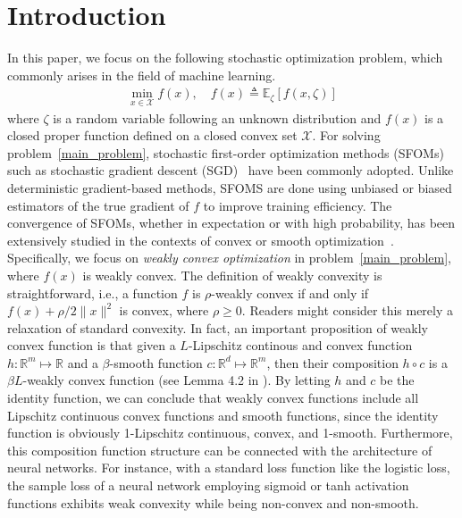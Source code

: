 \documentclass{article}
\def \E {\mathbb{E}}
\def \X {\mathcal{X}}
\def \R {\mathbb{R}}
\begin{document}
\section{Introduction}
In this paper, we focus on the following stochastic optimization problem, which commonly arises in the field of machine learning.
\begin{align}\label{main_problem}
        \min_{x\in\mathcal{X}} f(x),\quad f(x)\triangleq \E_\zeta[f(x,\zeta)]
\end{align}
where $\zeta$ is a random variable following an unknown distribution and $f(x)$ is a closed proper function defined on a closed convex set $\X$. For solving problem~\eqref{main_problem}, stochastic first-order optimization methods (SFOMs) such as stochastic gradient descent (SGD)~\citep{Robbins1951ASA} have been commonly adopted. Unlike deterministic gradient-based methods, SFOMS are done using unbiased or biased estimators of the true gradient of $f$ to improve training efficiency. The convergence of SFOMs, whether in expectation or with high probability, has been extensively studied in the contexts of convex or smooth optimization~\citep{ghadimi2013stochastic,fang2018spider,cutkosky2019momentum,lan2020first, cutkosky2020momentum,liuzijian_2023}. Specifically, we focus on \textit{weakly convex optimization} in problem~\eqref{main_problem}, where $f(x)$ is weakly convex. The definition of weakly convexity is straightforward, i.e., a function $f$ is $\rho$-weakly convex if and only if $f(x)+\rho/2\|x\|^2$ is convex, where $\rho\geq0$. Readers might consider this merely a relaxation of standard convexity. In fact, an important proposition of weakly convex function is that given a $L$-Lipschitz continous and convex function $h:\R^m\mapsto\R$ and a $\beta$-smooth function $c:\R^d\mapsto\R^m$, then their composition $h\circ c$ is a $\beta L$-weakly convex function (see Lemma 4.2 in \citep{drusvyatskiy2017efficiencyminimizingcompositionsconvex}). By letting $h$ and $c$ be the identity function, we can conclude that weakly convex functions include all Lipschitz continuous convex functions and smooth functions, since the identity function is obviously 1-Lipschitz continuous, convex, and 1-smooth. Furthermore, this composition function structure can be connected with the architecture of neural networks. For instance, with a standard loss function like the logistic loss, the sample loss of a neural network employing sigmoid or tanh activation functions exhibits weak convexity while being non-convex and non-smooth.
\end{document}
